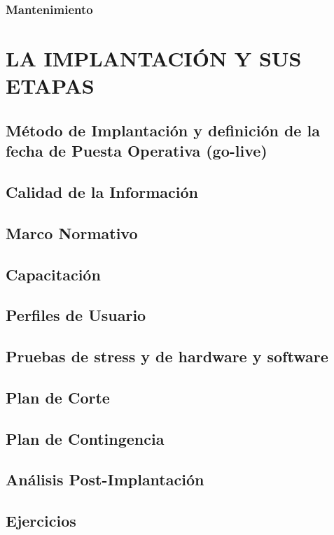 \documentclass[12pt]{book}
\begin{document}
\subsection{Mantenimiento}

\chapter{LA IMPLANTACIÓN Y SUS ETAPAS}
\section{Método de Implantación y definición de la fecha de Puesta Operativa (go-live)}
\section{Calidad de la Información}
\section{Marco Normativo}
\section{Capacitación}
\section{Perfiles de Usuario}
\section{Pruebas de stress y de hardware y software}
\section{Plan de Corte}
\section{Plan de Contingencia}
\section{Análisis Post-Implantación}
\section{Ejercicios}
\end{document}
